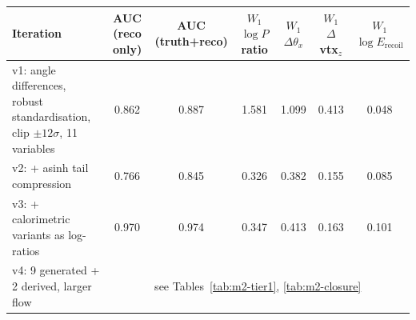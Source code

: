 \begin{tabular}{lcccccc}
\toprule
Iteration & AUC (reco only) & AUC (truth+reco) & $W_1$ $\log P$ ratio & $W_1$ $\Delta\theta_x$ & $W_1$ $\Delta$vtx$_z$ & $W_1$ $\log E_\mathrm{recoil}$ \\
\midrule
v1: angle differences, robust standardisation, clip $\pm 12\sigma$, 11 variables & 0.862 & 0.887 & 1.581 & 1.099 & 0.413 & 0.048 \\
v2: + asinh tail compression & 0.766 & 0.845 & 0.326 & 0.382 & 0.155 & 0.085 \\
v3: + calorimetric variants as log-ratios & 0.970 & 0.974 & 0.347 & 0.413 & 0.163 & 0.101 \\
v4: 9 generated + 2 derived, larger flow & \multicolumn{6}{c}{see Tables~\ref{tab:m2-tier1}, \ref{tab:m2-closure}} \\
\bottomrule
\end{tabular}

